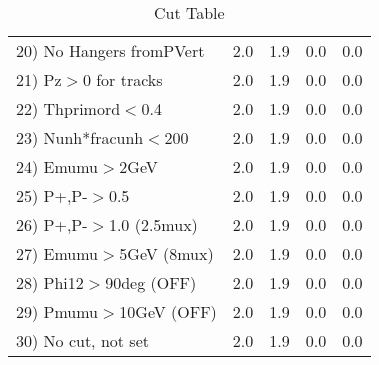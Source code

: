 \begin{table}[h!]
\begin{tabular}{||l||r|r|r|r||}
 20) No Hangers fromPVert &         2.0 &         1.9 &         0.0 &         0.0 \\
 21) Pz$>$0 for tracks    &         2.0 &         1.9 &         0.0 &         0.0 \\
 22) Thprimord$<$0.4      &         2.0 &         1.9 &         0.0 &         0.0 \\
 23) Nunh*fracunh$<$200   &         2.0 &         1.9 &         0.0 &         0.0 \\
 24) Emumu$>$2GeV         &         2.0 &         1.9 &         0.0 &         0.0 \\
 25) P+,P-$>$0.5          &         2.0 &         1.9 &         0.0 &         0.0 \\
 26) P+,P-$>$1.0 (2.5mux) &         2.0 &         1.9 &         0.0 &         0.0 \\
 27) Emumu$>$5GeV  (8mux) &         2.0 &         1.9 &         0.0 &         0.0 \\
 28) Phi12$>$90deg  (OFF) &         2.0 &         1.9 &         0.0 &         0.0 \\
 29) Pmumu$>$10GeV  (OFF) &         2.0 &         1.9 &         0.0 &         0.0 \\
 30) No cut, not set      &         2.0 &         1.9 &         0.0 &         0.0 \\
 \hline
 \hline
 \end{tabular}
 \caption{Cut Table \cohpip }
 \label{tab-cut_copip}
 \end{table}
